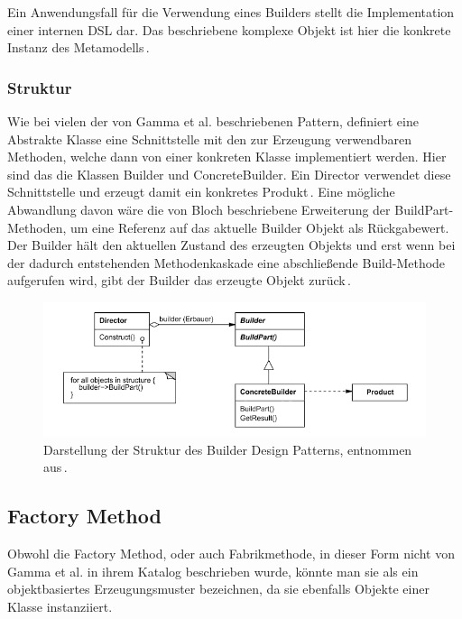 \documentclass[12pt,oneside,a4paper,parskip]{scrbook}
\begin{document}
Ein Anwendungsfall für die Verwendung eines Builders stellt die Implementation einer internen DSL dar. Das beschriebene komplexe Objekt ist hier die konkrete Instanz des Metamodells\,\cite[S.\,343ff.]{fowler2010}.

\subsubsection{Struktur}

Wie bei vielen der von Gamma et al. beschriebenen Pattern, definiert eine Abstrakte Klasse eine Schnittstelle mit den zur Erzeugung verwendbaren Methoden, welche dann von einer konkreten Klasse implementiert werden. Hier sind das die Klassen Builder und ConcreteBuilder. Ein Director verwendet diese Schnittstelle und erzeugt damit ein konkretes Produkt\,\cite[S.\,162f.]{gamma2015}. Eine mögliche Abwandlung davon wäre die von Bloch beschriebene Erweiterung der BuildPart-Methoden, um eine Referenz auf das aktuelle Builder Objekt als Rückgabewert. Der Builder hält den aktuellen Zustand des erzeugten Objekts und erst wenn bei der dadurch entstehenden Methodenkaskade eine abschließende Build-Methode aufgerufen wird, gibt der Builder das erzeugte Objekt zurück\,\cite[S.\,13ff]{bloch2017}.

\begin{figure}[htbp]
\centering
\includegraphics[width=1.0\textwidth]{bilder/builder}
\caption{Darstellung der Struktur des Builder Design Patterns, entnommen aus\,\cite[S.\,162]{gamma2015}.}
\label{fig:builder}
\end{figure}

\subsection{Factory Method}

Obwohl die Factory Method, oder auch Fabrikmethode, in dieser Form nicht von Gamma et al. in ihrem Katalog beschrieben wurde, könnte man sie als ein objektbasiertes Erzeugungsmuster bezeichnen, da sie ebenfalls Objekte einer Klasse instanziiert.
\end{document}
